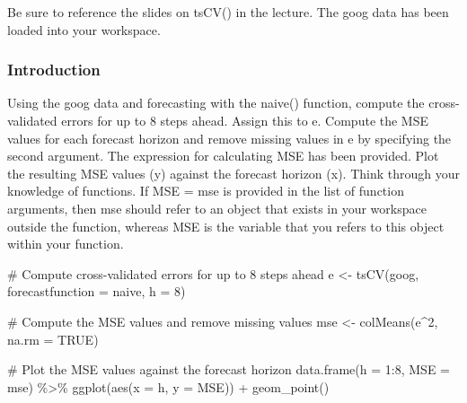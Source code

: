 \documentclass[
  letterpaper,
  DIV=11,
  numbers=noendperiod]{scrartcl}
\newenvironment{Shaded}{\begin{snugshade}}{\end{snugshade}}
\newcommand{\AttributeTok}[1]{\textcolor[rgb]{0.40,0.45,0.13}{#1}}
\newcommand{\CommentTok}[1]{\textcolor[rgb]{0.37,0.37,0.37}{#1}}
\newcommand{\ConstantTok}[1]{\textcolor[rgb]{0.56,0.35,0.01}{#1}}
\newcommand{\DecValTok}[1]{\textcolor[rgb]{0.68,0.00,0.00}{#1}}
\newcommand{\FunctionTok}[1]{\textcolor[rgb]{0.28,0.35,0.67}{#1}}
\newcommand{\NormalTok}[1]{\textcolor[rgb]{0.00,0.23,0.31}{#1}}
\newcommand{\OtherTok}[1]{\textcolor[rgb]{0.00,0.23,0.31}{#1}}
\newcommand{\SpecialCharTok}[1]{\textcolor[rgb]{0.37,0.37,0.37}{#1}}
\begin{document}
Be sure to reference the slides on tsCV() in the lecture. The goog data
has been loaded into your workspace.

\hypertarget{introduction}{%
\subsubsection{Introduction}\label{introduction}}

Using the goog data and forecasting with the naive() function, compute
the cross-validated errors for up to 8 steps ahead. Assign this to e.
Compute the MSE values for each forecast horizon and remove missing
values in e by specifying the second argument. The expression for
calculating MSE has been provided. Plot the resulting MSE values (y)
against the forecast horizon (x). Think through your knowledge of
functions. If MSE = mse is provided in the list of function arguments,
then mse should refer to an object that exists in your workspace outside
the function, whereas MSE is the variable that you refers to this object
within your function.

\begin{Shaded}
\begin{Highlighting}[]
\CommentTok{\# Compute cross{-}validated errors for up to 8 steps ahead}
\NormalTok{e }\OtherTok{\textless{}{-}} \FunctionTok{tsCV}\NormalTok{(goog, }\AttributeTok{forecastfunction =}\NormalTok{ naive, }\AttributeTok{h =} \DecValTok{8}\NormalTok{)}

\CommentTok{\# Compute the MSE values and remove missing values}
\NormalTok{mse }\OtherTok{\textless{}{-}} \FunctionTok{colMeans}\NormalTok{(e}\SpecialCharTok{\^{}}\DecValTok{2}\NormalTok{, }\AttributeTok{na.rm =} \ConstantTok{TRUE}\NormalTok{)}

\CommentTok{\# Plot the MSE values against the forecast horizon}
\FunctionTok{data.frame}\NormalTok{(}\AttributeTok{h =} \DecValTok{1}\SpecialCharTok{:}\DecValTok{8}\NormalTok{, }\AttributeTok{MSE =}\NormalTok{ mse) }\SpecialCharTok{\%\textgreater{}\%}
  \FunctionTok{ggplot}\NormalTok{(}\FunctionTok{aes}\NormalTok{(}\AttributeTok{x =}\NormalTok{ h, }\AttributeTok{y =}\NormalTok{ MSE)) }\SpecialCharTok{+} \FunctionTok{geom\_point}\NormalTok{()}
\end{Highlighting}
\end{Shaded}
\end{document}
